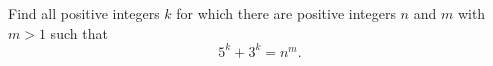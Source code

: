 Find all positive integers $k$ for which there are positive integers $n$ and $m$ with $m>1$ such that
\[
5^k+3^k=n^m .
\]

